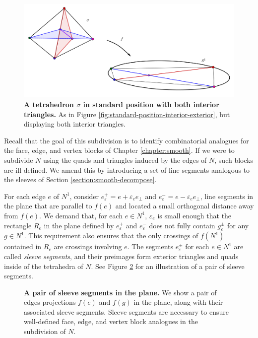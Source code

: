\begin{figure}[h!]
	\centering
	\includegraphics[width=\textwidth]{figures/standard-position-interior-interior.png}
	\caption{
		\textbf{A tetrahedron $\sigma$ in standard position with both interior triangles.}
		As in Figure \ref{fig:standard-position-interior-exterior}, but displaying both interior triangles.
	}
	\label{fig:standard-position-interior-interior}
\end{figure}

Recall that the goal of this subdivision is to identify combinatorial analogues for the face, edge, and vertex blocks of Chapter \ref{chapter:smooth}.
If we were to subdivide $N$ using the quads and triangles induced by the edges of $N$, such blocks are ill-defined.
We amend this by introducing a set of line segments analogous to the sleeves of Section \ref{section:smooth-decompose}.

For each edge $e$ of $N^1$, consider $e_\varepsilon^+ = e+\varepsilon_e e_\perp$ and $e_\varepsilon^- =e-\varepsilon_e e_\perp$, line segments in the plane that are parallel to $f(e)$ and located a small orthogonal distance away from $f(e)$.
We demand that, for each $e\in N^1$, $\varepsilon_e$ is small enough that the rectangle $R_e$ in the plane defined by $e_\varepsilon^+$ and $e_\varepsilon^-$ does not fully contain $g_\varepsilon^\pm$ for any $g\in N^1$.
This requirement also ensures that the only crossings of $f(N^1)$ contained in $R_e$ are crossings involving $e$.
The segments $e_\varepsilon^\pm$ for each $e\in N^1$ are called \emph{sleeve segments}, and their preimages form exterior triangles and quads inside of the tetrahedra of $N$.
See Figure \ref{fig:pl-sleeves} for an illustration of a pair of sleeve segments.

\begin{figure}[h!]
	\caption{
		\textbf{A pair of sleeve segments in the plane.}
		We show a pair of edges projections $f(e)$ and $f(g)$ in the plane, along with their associated sleeve segments.
		Sleeve segments are necessary to ensure well-defined face, edge, and vertex block analogues in the subdivision of $N$.
	}
	\label{fig:pl-sleeves}
\end{figure}

